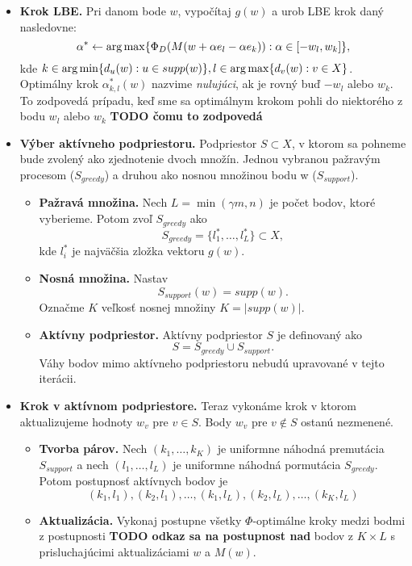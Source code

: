\begin{itemize}
	\item \textbf{Krok LBE.} Pri danom bode $w$, vypočítaj $g(w)$ a urob LBE krok daný nasledovne: $$\alpha^* \leftarrow \operatorname*{arg\,max} \{ \Phi_D (M(w+\alpha e_l -\alpha e_k)) : \alpha \in [-w_l, w_k] \},$$ kde 
	$k \in \operatorname*{arg\,min} \{ d_u(w) : u \in supp(w)\}, l \in \operatorname*{arg\,max} \{ d_v(w) : v \in X \}$. Optimálny krok $\alpha^*_{k,l}(w)$ nazvime \textit{nulujúci}, ak je rovný buď $-w_l$ alebo $w_k$. To zodpovedá prípadu, keď sme sa optimálnym krokom pohli do niektorého z bodu $w_l$ alebo $w_k$ \textbf{TODO čomu to zodpovedá}

	\item \textbf{Výber aktívneho podpriestoru.} Podpriestor $S \subset X$, v ktorom sa pohneme bude zvolený ako zjednotenie dvoch množín. Jednou vybranou pažravým procesom ($S_{greedy}$) a druhou ako nosnou množinou bodu w ($S_{support}$).
	\begin{itemize}
		\item \textbf{Pažravá množina.} Nech $L=\min (\gamma m, n)$ je počet bodov, ktoré vyberieme. Potom zvoľ $S_{greedy}$ ako $$S_{greedy} = \{l_1^*, \dots, l_L^* \} \subset X,$$ kde $l_i^*$ je najväčšia zložka vektoru $g(w)$.
		\item \textbf{Nosná množina.} Nastav $$S_{support}(w)=supp(w).$$ Označme $K$ veľkosť nosnej množiny $K= |supp(w)|$.
		\item \textbf{Aktívny podpriestor.} Aktívny podpriestor $S$ je definovaný ako $$S=S_{greedy} \cup S_{support}.$$ Váhy bodov mimo aktívneho podpriestoru nebudú upravované v tejto iterácii.
	\end{itemize}

	\item \textbf{Krok v aktívnom podpriestore.} Teraz vykonáme krok v ktorom aktualizujeme hodnoty $w_v$ pre $v \in S$. Body $w_v$ pre $v \not \in S$ ostanú nezmenené.
	\begin{itemize}
		\item \textbf{Tvorba párov.} Nech $(k_1, \dots, k_K)$ je uniformne náhodná premutácia $S_{support}$ a nech $(l_1, \dots, l_L)$ je uniformne náhodná pormutácia $S_{greedy}$. Potom postupnosť aktívnych bodov je $$ (k_1,l_1), (k_2, l_1), \dots, (k_1, l_L), (k_2,l_L), \dots, (k_K, l_L) $$
		\item \textbf{Aktualizácia.} Vykonaj postupne všetky $\Phi$-optimálne kroky medzi bodmi z postupnosti \textbf{TODO odkaz sa na postupnost nad} bodov z $K \times L$ s prisluchajúcimi aktualizáciami $w$ a $M(w)$.
	\end{itemize}
\end{itemize}


